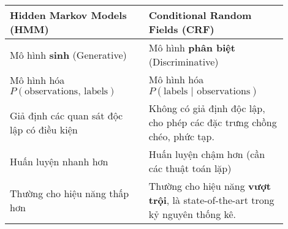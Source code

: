 \begin{tcolorbox}[
    title=So sánh HMM và CRF,
    colback=green!5!white, colframe=green!60!black, fonttitle=\bfseries
]
\begin{tabular}{p{0.45\linewidth} | p{0.45\linewidth}}
    \textbf{Hidden Markov Models (HMM)} & \textbf{Conditional Random Fields (CRF)} \\
    \hline
    Mô hình \textbf{sinh} (Generative) & Mô hình \textbf{phân biệt} (Discriminative) \\
    \hline
    Mô hình hóa $P(\text{observations, labels})$ & Mô hình hóa $P(\text{labels | observations})$ \\
    \hline
    Giả định các quan sát độc lập có điều kiện & Không có giả định độc lập, cho phép các đặc trưng chồng chéo, phức tạp. \\
    \hline
    Huấn luyện nhanh hơn & Huấn luyện chậm hơn (cần các thuật toán lặp) \\
    \hline
    Thường cho hiệu năng thấp hơn & Thường cho hiệu năng \textbf{vượt trội}, là state-of-the-art trong kỷ nguyên thống kê. \\
\end{tabular}
\end{tcolorbox}